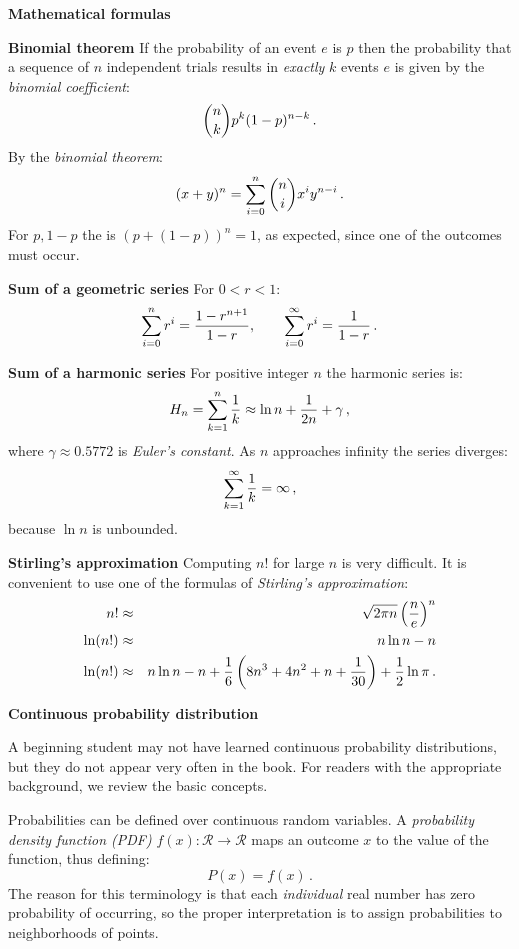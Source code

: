 \bigskip

\textbf{\large Mathematical formulas}

\textbf{Binomial theorem}
If the probability of an event $e$ is $p$ then the probability that a sequence of $n$ independent trials results in \emph{exactly} $k$ events $e$ is given by the \emph{binomial coefficient}:
\[
\displaystyle{n \choose k} p^k (1-p)^{n-k}\,.
\]
By the \emph{binomial theorem}:
\[
(x+y)^n=\sum_{i=0}^{n} \displaystyle{n \choose i} x^i y^{n-i}\,.
\]
For $p,1-p$ the is $(p+(1-p))^n=1$, as expected, since one of the outcomes must occur.

\textbf{Sum of a geometric series}
For $0<r<1$:
\[
\sum_{i=0}^{n} r^i = \displaystyle\frac{1-r^{n+1}}{1-r},\quad\quad
\sum_{i=0}^{\infty} r^i = \displaystyle\frac{1}{1-r}\,.
\]

\textbf{Sum of a harmonic series}\label{p.harmonic}
For positive integer $n$ the harmonic series is:
\[
H_n=\sum_{k=1}^{n}\displaystyle\frac{1}{k}\approx \ln n + \frac{1}{2n} + \gamma\,,
\]
where $\gamma \approx 0.5772$ is \emph{Euler's constant}. As $n$ approaches infinity the series diverges:
\[
\sum_{k=1}^{\infty}\displaystyle\frac{1}{k}=\infty\,,
\]
because $\ln n$ is unbounded.

\textbf{Stirling's approximation}
Computing $n!$ for large $n$ is very difficult. It is convenient to use one of the formulas of \emph{Stirling's approximation}:
\begin{eqnarray*}
n! &\approx& \sqrt{2\pi n}\left(\displaystyle\frac{n}{e}\right)^n\\
\ln (n!) &\approx& n\ln n - n\\
\ln (n!)  &\approx& n\ln n - n + \frac{1}{6}\left(8n^3+4n^2+n+\frac{1}{30}\right)+\frac{1}{2}\ln\pi\,.
\end{eqnarray*}

\medskip

\textbf{\large Continuous probability distribution}\label{p.continuous}

A beginning student may not have learned continuous probability distributions, but they do not appear very often in the book. For readers with the appropriate background, we review the basic concepts.

Probabilities can be defined over continuous random variables. A  \emph{probability density function (PDF)} $f(x): \mathcal{R}\rightarrow \mathcal{R}$ maps an outcome $x$ to the value of the function, thus defining:
\[
P(x) = f(x)\,.
\]
The reason for this terminology is that each \emph{individual} real number has zero probability of occurring, so the proper interpretation is to assign probabilities to neighborhoods of points.

